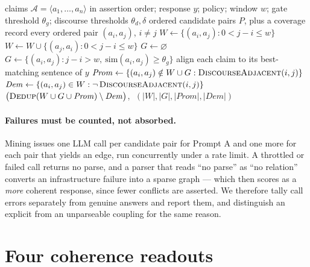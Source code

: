 \begin{algorithm}[t]
\caption{\textsc{SelectCandidatePairs}: response-anchored candidate selection.}
\label{alg-pairs}
\begin{algorithmic}[1]
\Require claims $\mathcal{A}=\langle a_1,\dots,a_n\rangle$ in assertion order; response $y$;
  policy; window $w$; gate threshold $\theta_g$; discourse thresholds $\theta_d,\delta$
\Ensure ordered candidate pairs $P$, plus a coverage record
 \Return every ordered pair $(a_i,a_j)$, $i\neq j$ \EndIf
\State $W \gets \{(a_i,a_j) : 0 < j-i \le w\}$ 
 $W \gets W \cup \{(a_j,a_i) : 0 < j-i \le w\}$ \EndIf
\State $G \gets \varnothing$
  \State $G \gets \{(a_i,a_j) : j-i > w,\ \mathrm{sim}(a_i,a_j)\ge\theta_g\}$
\EndIf
\State align each claim to its best-matching sentence of $y$
\State $\mathit{Prom} \gets \{(a_i,a_j)\notin W\cup G : \textsc{DiscourseAdjacent}(i,j)\}$
\State $\mathit{Dem} \gets \{(a_i,a_j)\in W : \neg\,\textsc{DiscourseAdjacent}(i,j)\}$
\State \Return $\bigl(\textsc{Dedup}(W \cup G \cup \mathit{Prom}) \setminus \mathit{Dem}\bigr)$,
  $\;(|W|,|G|,|\mathit{Prom}|,|\mathit{Dem}|)$
\end{algorithmic}
\end{algorithm}

\paragraph{Failures must be counted, not absorbed.} Mining issues one LLM call per candidate pair for
Prompt A and one more for each pair that yields an edge, run concurrently under a rate limit. A
throttled or failed call returns no parse, and a parser that reads ``no parse'' as ``no relation''
converts an infrastructure failure into a sparse graph --- which then scores as a \emph{more}
coherent response, since fewer conflicts are asserted. We therefore tally call errors separately
from genuine  answers and report them, and distinguish an explicit 
from an unparseable coupling for the same reason.

\section{Four coherence readouts}
\label{sec-readouts}

